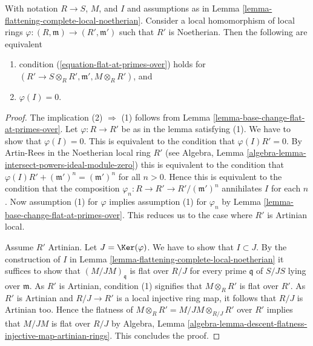 \begin{lemma}
\label{lemma-flattening-complete-local-noetherian-property-by-finite-type}
With notation $R \to S$, $M$, and $I$ and assumptions as in
Lemma \ref{lemma-flattening-complete-local-noetherian}.
Consider a local homomorphism of local rings
$\varphi : (R, \mathfrak m) \to (R', \mathfrak m')$
such that $R'$ is Noetherian. Then the following are equivalent
\begin{enumerate}
\item condition (\ref{equation-flat-at-primes-over}) holds
for $(R' \to S \otimes_R R', \mathfrak m', M \otimes_R R')$, and
\item $\varphi(I) = 0$.
\end{enumerate}
\end{lemma}

\begin{proof}
The implication (2) $\Rightarrow$ (1) follows from
Lemma \ref{lemma-base-change-flat-at-primes-over}.
Let $\varphi : R \to R'$ be as in the lemma satisfying (1).
We have to show that $\varphi(I) = 0$.
This is equivalent to the condition that $\varphi(I)R' = 0$.
By Artin-Rees in the Noetherian local ring $R'$ (see
Algebra, Lemma \ref{algebra-lemma-intersect-powers-ideal-module-zero})
this is equivalent to the condition that
$\varphi(I)R' + (\mathfrak m')^n = (\mathfrak m')^n$ for all $n > 0$.
Hence this is equivalent to the condition that the composition
$\varphi_n : R \to R' \to R'/(\mathfrak m')^n$ annihilates $I$ for each $n$.
Now assumption (1) for $\varphi$ implies assumption (1) for
$\varphi_n$ by
Lemma \ref{lemma-base-change-flat-at-primes-over}.
This reduces us to the case where $R'$ is Artinian local.

\medskip\noindent
Assume $R'$ Artinian. Let $J = \Ker(\varphi)$. We have to show that
$I \subset J$. By the construction of $I$ in
Lemma \ref{lemma-flattening-complete-local-noetherian}
it suffices to show that $(M/JM)_{\mathfrak q}$ is flat over $R/J$
for every prime $\mathfrak q$ of $S/JS$ lying over $\mathfrak m$.
As $R'$ is Artinian, condition (1) signifies that $M \otimes_R R'$
is flat over $R'$. As $R'$ is Artinian and $R/J \to R'$ is a local
injective ring map, it follows that $R/J$ is Artinian
too. Hence the flatness of $M \otimes_R R' = M/JM \otimes_{R/J} R'$ over
$R'$ implies that $M/JM$ is flat over $R/J$ by
Algebra,
Lemma \ref{algebra-lemma-descent-flatness-injective-map-artinian-rings}.
This concludes the proof.
\end{proof}

